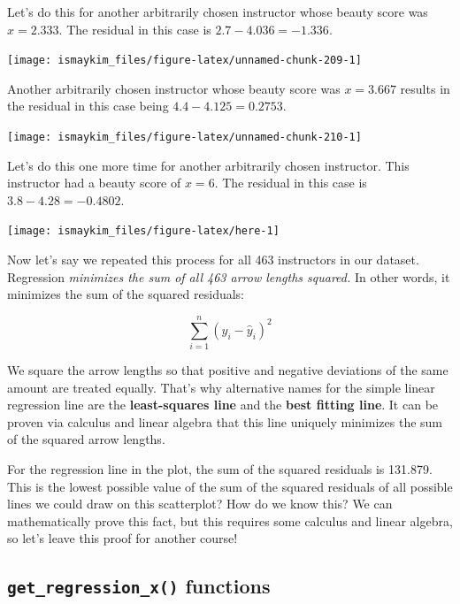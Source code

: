 \documentclass[12pt,]{krantz}
\theoremstyle{definition}
\theoremstyle{definition}
\theoremstyle{definition}
\theoremstyle{remark}
\begin{document}
Let's do this for another arbitrarily chosen instructor whose beauty
score was \(x=2.333\). The residual in this case is
\(2.7 - 4.036 = -1.336\).

\begin{center}\texttt{[image: ismaykim\_files/figure-latex/unnamed-chunk-209-1]} \end{center}

Another arbitrarily chosen instructor whose beauty score was \(x=3.667\)
results in the residual in this case being \(4.4 - 4.125 = 0.2753\).

\begin{center}\texttt{[image: ismaykim\_files/figure-latex/unnamed-chunk-210-1]} \end{center}

Let's do this one more time for another arbitrarily chosen instructor.
This instructor had a beauty score of \(x = 6\). The residual in this
case is \(3.8 - 4.28 = -0.4802\).

\begin{center}\texttt{[image: ismaykim\_files/figure-latex/here-1]} \end{center}

Now let's say we repeated this process for all 463 instructors in our
dataset. Regression \emph{minimizes the sum of all 463 arrow lengths
squared.} In other words, it minimizes the sum of the squared residuals:

\[
\sum_{i=1}^{n}(y_i - \widehat{y}_i)^2
\]

We square the arrow lengths so that positive and negative deviations of
the same amount are treated equally. That's why alternative names for
the simple linear regression line are the \textbf{least-squares line}
and the \textbf{best fitting line}. It can be proven via calculus and
linear algebra that this line uniquely minimizes the sum of the squared
arrow lengths.

For the regression line in the plot, the sum of the squared residuals is
131.879. This is the lowest possible value of the sum of the squared
residuals of all possible lines we could draw on this scatterplot? How
do we know this? We can mathematically prove this fact, but this
requires some calculus and linear algebra, so let's leave this proof for
another course!

\subsection{\texorpdfstring{\texttt{get\_regression\_x()}
functions}{get\_regression\_x() functions}}\label{underthehood}
\end{document}
